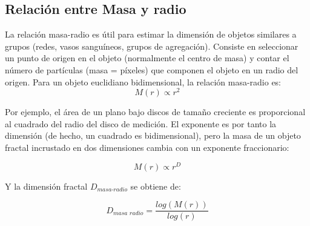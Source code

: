 \documentclass[11pt]{article}
\begin{document}
  

\subsection{Relaci\'{o}n entre Masa y radio}

La relaci\'{o}n masa-radio es \'{u}til para estimar la dimensi\'{o}n de objetos similares a grupos (redes, vasos sangu\'{i}neos, grupos de agregaci\'{o}n). Consiste en seleccionar un punto de origen en el objeto (normalmente el centro de masa) y contar el n\'{u}mero de part\'{i}culas (masa = p\'{i}xeles) que componen el objeto en un radio del origen. Para un objeto euclidiano bidimensional, la relaci\'{o}n masa-radio es:
\begin{equation}
M(r) \propto r^{2}
\end{equation}

Por ejemplo, el \'{a}rea de un plano bajo discos de tamaño creciente es proporcional al cuadrado del radio del disco de medici\'{o}n. El exponente es por tanto la dimensi\'{o}n (de hecho, un cuadrado es bidimensional), pero la masa de un objeto fractal incrustado en dos dimensiones cambia con un exponente fraccionario:

\begin{equation}
M(r) \propto r^{D} 
\end{equation}

Y la dimensi\'{o}n fractal $D_\textit{{masa-radio}}$ se obtiene de:

\begin{equation}
D_\textit{masa radio} = \frac{log (M(r))}{log (r)}
\end{equation}
\end{document}
